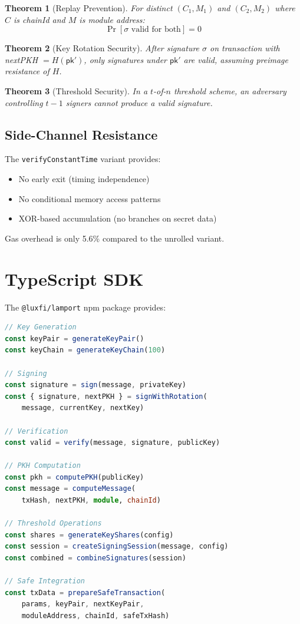 \documentclass[11pt,a4paper]{article}
\newtheorem{theorem}{Theorem}
\begin{document}
\begin{theorem}[Replay Prevention]
For distinct $(C_1, M_1)$ and $(C_2, M_2)$ where $C$ is chainId and $M$ is module address:
\[
\Pr[\sigma \text{ valid for both}] = 0
\]
\end{theorem}

\begin{theorem}[Key Rotation Security]
After signature $\sigma$ on transaction with nextPKH $= H(\mathsf{pk}')$, only signatures under $\mathsf{pk}'$ are valid, assuming preimage resistance of $H$.
\end{theorem}

\begin{theorem}[Threshold Security]
In a $t$-of-$n$ threshold scheme, an adversary controlling $t-1$ signers cannot produce a valid signature.
\end{theorem}

\subsection{Side-Channel Resistance}

The \texttt{verifyConstantTime} variant provides:
\begin{itemize}
    \item No early exit (timing independence)
    \item No conditional memory access patterns
    \item XOR-based accumulation (no branches on secret data)
\end{itemize}

Gas overhead is only 5.6\% compared to the unrolled variant.

\section{TypeScript SDK}

The \texttt{@luxfi/lamport} npm package provides:

\begin{lstlisting}[language=TypeScript]
// Key Generation
const keyPair = generateKeyPair()
const keyChain = generateKeyChain(100)

// Signing
const signature = sign(message, privateKey)
const { signature, nextPKH } = signWithRotation(
    message, currentKey, nextKey)

// Verification
const valid = verify(message, signature, publicKey)

// PKH Computation
const pkh = computePKH(publicKey)
const message = computeMessage(
    txHash, nextPKH, module, chainId)

// Threshold Operations
const shares = generateKeyShares(config)
const session = createSigningSession(message, config)
const combined = combineSignatures(session)

// Safe Integration
const txData = prepareSafeTransaction(
    params, keyPair, nextKeyPair,
    moduleAddress, chainId, safeTxHash)
\end{lstlisting}
\end{document}
